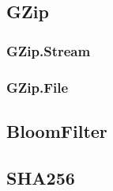 \documentclass{article}
\begin{document}
\subsection{GZip}

\subsubsection{GZip.Stream}

\subsubsection{GZip.File}

\subsection{BloomFilter}

\subsection{SHA256}


\clearpage
\appendix
\end{document}
